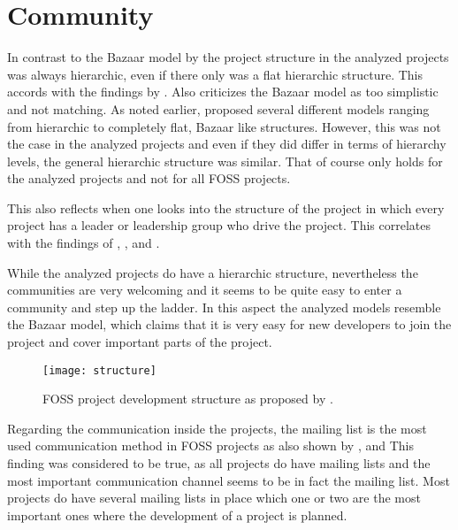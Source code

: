 
\section{Community} %

In contrast to the Bazaar model by \textcite{Raymond1998} the project structure
in the analyzed projects was always hierarchic, even if there only was a flat
hierarchic structure. This accords with the findings by
\textcite{Crowston2005}. Also \textcite{Bezroukov1999,Bezroukov1999a}
criticizes the Bazaar model as too simplistic and not matching. As noted
earlier, \textcite{Ghosh2005} proposed several different models ranging from
hierarchic to completely flat, Bazaar like structures. However, this was not
the case in the analyzed projects and even if they did differ in terms of
hierarchy levels, the general hierarchic structure was similar. That of course
only holds for the analyzed projects and not for all \ac{FOSS} projects.

This also reflects when one looks into the structure of the project in which
every project has a leader or leadership group who drive the project. This
correlates with the findings of \textcite{Johnson2001},
\textcite{Crowston2005a}, \textcite{Warsta2003} and
\textcite{Krishnamurthy2002}.

While the analyzed projects do have a hierarchic structure, nevertheless the
communities are very welcoming and it seems to be quite easy to enter a
community and step up the ladder. In this aspect the analyzed models resemble
the Bazaar model, which claims that it is very easy for new developers
to join the project and cover important parts of the project.

\begin{figure}[htbp]
  \centering
  \texttt{[image: structure]}
  \caption[\acl{FOSS} project development structure]
  {\acl{FOSS} project development structure as proposed by \textcite{Crowston2005}.}
\end{figure}

Regarding the communication inside the projects, the mailing list is the most
used communication method in \ac{FOSS} projects as also shown by
\textcite{Schweik2003}, \textcite{Ogawa2007} and \textcite{Kim2003} This
finding was considered to be true, as all projects do have mailing lists and
the most important communication channel seems to be in fact the mailing list.
Most projects do have several mailing lists in place which one or two are the
most important ones where the development of a project is planned.

